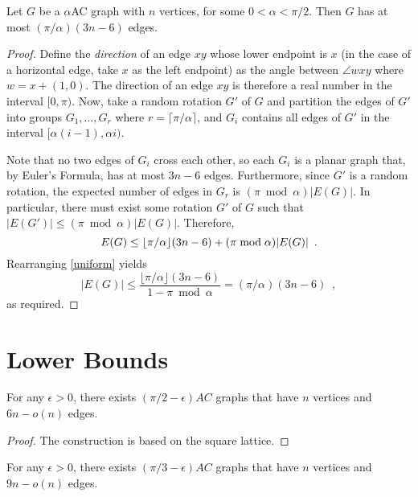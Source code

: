 \documentclass[lotsofwhite,charterfonts]{patmorin}
\begin{document}
\begin{thm}
Let $G$ be a $\alpha$AC graph with $n$ vertices, for some $0<\alpha<\pi/2$.
Then $G$ has at most $(\pi/\alpha)(3n-6)$ edges.
\end{thm}

\begin{proof}
Define the \emph{direction} of an edge $xy$ whose lower endpoint is $x$ (in
the case of a horizontal edge, take $x$ as the left endpoint) as the angle
between $\angle wxy$ where $w=x+(1,0)$.  The direction of an edge $xy$ is
therefore a real number in the interval $[0,\pi)$.  Now, take a random
rotation $G'$ of $G$ and partition the edges of $G'$ into groups
$G_1,\ldots,G_{r}$ where $r=\lceil\pi/\alpha\rceil$, and $G_i$ contains all
edges of $G'$ in the interval $[\alpha(i-1),\alpha i)$.

Note that no two edges of $G_i$ cross each other, so each $G_i$ is
a planar graph that, by Euler's Formula, has at most $3n-6$ edges.
Furthermore, since $G'$ is a random rotation, the expected number of
edges in $G_{r}$ is $(\pi\bmod \alpha) |E(G)|$.  In particular, there
must exist some rotation $G'$ of $G$ such that $|E(G')| \le (\pi\bmod
\alpha) |E(G)|$.  Therefore,
\begin{equation}
   E(G) \le \lfloor \pi/\alpha \rfloor(3n-6) + (\pi\bmod\alpha)|E(G)| \enspace .
   \eqlabel{uniform}
\end{equation}
Rearranging \eqref{uniform} yields
\[  
  |E(G)| 
    \le  \frac{\lfloor \pi/\alpha \rfloor(3n-6)}{1-\pi\bmod\alpha} 
    = (\pi/\alpha)(3n-6) \enspace ,
\]
as required.
\end{proof}

\section{Lower Bounds}

\begin{thm}
For any $\epsilon > 0$,  there exists
$(\pi/2-\epsilon)AC$ graphs that have $n$ vertices and $6n- o(n)$ edges.
\end{thm}

\begin{proof}
The construction is based on the square lattice.
\end{proof}

\begin{thm}
For any $\epsilon > 0$, there exists
$(\pi/3-\epsilon)AC$ graphs that have $n$ vertices and $9n- o(n)$ edges.
\end{thm}
\end{document}
